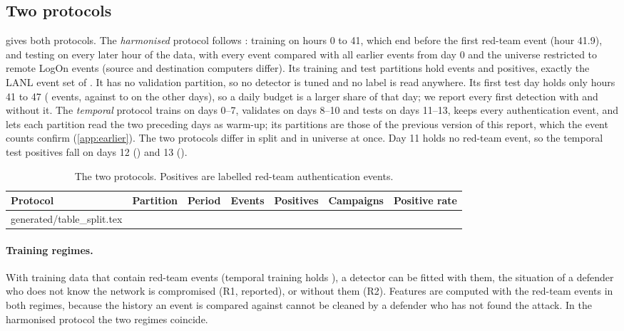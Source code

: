 \documentclass[11pt,a4paper]{article}
\makeatletter
\newcommand{\tablerows}[1]{\@@input #1 }
\makeatother
\begin{document}
\subsection{Two protocols}
\label{sec:split}
 gives both protocols. The \emph{harmonised} protocol follows \textcite{larroche2026fair}: training on hours 0 to 41, which end before the first red-team event (hour 41.9), and testing on every later hour of the data, with every event compared with all earlier events from day 0 and the universe restricted to remote LogOn events (source and destination computers differ). Its training and test partitions hold \HarmUniverseEvents{} events and \HarmTestPositives{} positives, exactly the LANL event set of \textcite[Table~4]{larroche2026fair}. It has no validation partition, so no detector is tuned and no label is read anywhere. Its first test day holds only hours 41 to 47 (\HarmDayOneEvents{} events, against \HarmOtherDaysMin{} to \HarmOtherDaysMax{} on the other days), so a daily budget is a larger share of that day; we report every first detection with and without it. The \emph{temporal} protocol trains on days 0--7, validates on days 8--10 and tests on days 11--13, keeps every authentication event, and lets each partition read the two preceding days as warm-up; its partitions are those of the previous version of this report, which the event counts confirm (\cref{app:earlier}). The two protocols differ in split and in universe at once. Day 11 holds no red-team event, so the temporal test positives fall on days 12 (\TempTestDayTwelvePositives{}) and 13 (\TempTestDayThirteenPositives{}).

\begin{table}[t]
\centering
\small
\begin{threeparttable}
\caption{The two protocols. Positives are labelled red-team authentication events.}
\label{tab:split}
\begin{tabular}{llllrrr}
\toprule
Protocol & Partition & Period & Events & Positives & Campaigns & Positive rate \\
\midrule
\tablerows{generated/table_split.tex}
\bottomrule
\end{tabular}
\end{threeparttable}
\end{table}

\paragraph{Training regimes.} With training data that contain red-team events (temporal training holds \TempTrainPositives{}), a detector can be fitted with them, the situation of a defender who does not know the network is compromised (R1, reported), or without them (R2). Features are computed with the red-team events in both regimes, because the history an event is compared against cannot be cleaned by a defender who has not found the attack. In the harmonised protocol the two regimes coincide.
\end{document}
